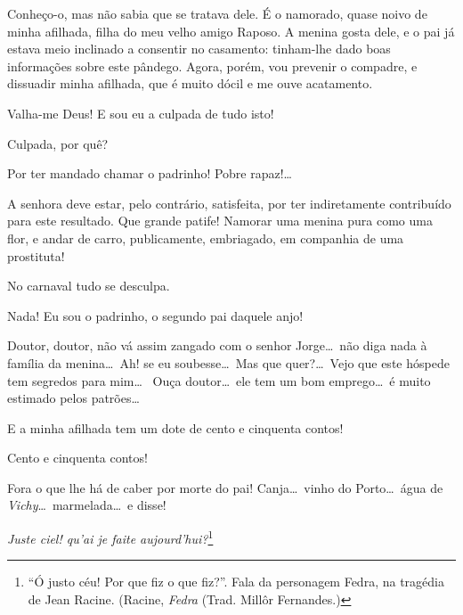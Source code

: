  Conheço{}-o, mas não sabia que se tratava dele. É o namorado,
quase noivo de minha afilhada, filha do meu velho amigo Raposo. A
menina gosta dele, e o pai já estava meio inclinado a consentir no
casamento: tinham{}-lhe dado boas informações sobre este pândego. Agora,
porém, vou prevenir o compadre, e dissuadir minha afilhada, que é muito
dócil e me ouve acatamento.

 Valha{}-me Deus! E sou eu a culpada de tudo isto!

 Culpada, por quê?

 Por ter mandado chamar o padrinho! Pobre rapaz!\ldots

 A senhora deve estar, pelo contrário, satisfeita, por ter
indiretamente contribuído para este resultado.  Que grande patife! Namorar uma menina pura como uma
flor, e andar de carro, publicamente, embriagado, em companhia de uma
prostituta!

 No carnaval tudo se desculpa.

 Nada! Eu sou o padrinho, o segundo pai daquele anjo!

  Doutor, doutor, não vá
assim zangado com o senhor Jorge\ldots\ não diga nada à família da
menina\ldots\ Ah! se eu soubesse\ldots\ Mas que quer?\ldots\ Vejo que este hóspede
tem segredos para mim\ldots\  Ouça
doutor\ldots\ ele tem um bom emprego\ldots\ é muito estimado pelos patrões\ldots

 E a minha afilhada tem um dote de cento e cinquenta contos!

  Cento e
cinquenta contos!

  Fora o que lhe há de caber por morte do
pai!  Canja\ldots\ vinho
do Porto\ldots\ água de \textit{Vichy}\ldots\ marmelada\ldots\ e disse!



  \textit{Juste ciel! qu’ai je faite aujourd’hui?}\footnote{
“Ó justo céu! Por que fiz o que fiz?”. Fala da personagem Fedra, na tragédia de
Jean Racine. (Racine, \textit{Fedra} (Trad. Millôr Fernandes.)}

